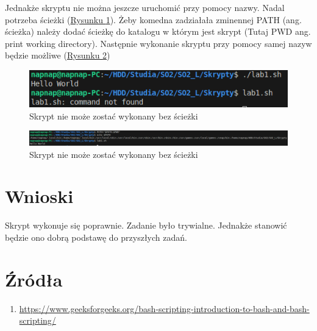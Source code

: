 \documentclass{article}
\begin{document}
      \FloatBarrier
      \raggedright
      Jednakże skryptu nie można jeszcze uruchomić przy pomocy nazwy. Nadal potrzeba ścieżki
      (\hyperref[fig:run_failed]{Rysunku \ref{fig:run_failed}}). Żeby komedna zadziałała zminennej PATH (ang. ścieżka)
      należy dodać ścieżkę do katalogu w którym jest skrypt (Tutaj PWD ang. print working directory). Następnie wykonanie 
      skryptu przy pomocy samej nazyw będzie możliwe (\hyperref[fig:run_succes]{Rysunku \ref{fig:run_succes}})
      \begin{figure}[ht]
        \centering
        \includegraphics[width=\textwidth]{images/run_failed.png}
        \caption{Skrypt nie może zostać wykonany bez ścieżki}
        \label{fig:run_failed}
      \end{figure}
      \begin{figure}[ht]
        \centering
        \includegraphics[width=\textwidth]{images/run_succes.png}
        \caption{Skrypt nie może zostać wykonany bez ścieżki}
        \label{fig:run_succes}
      \end{figure}
    \section{Wnioski}
      Skrypt wykonuje się poprawnie. Zadanie było trywialne. Jednakże stanowić będzie ono dobrą podstawę 
      do przyszłych zadań.
    \section{Źródła}
      \begin{enumerate}[label=\arabic*.]
        \item \url{https://www.geeksforgeeks.org/bash-scripting-introduction-to-bash-and-bash-scripting/}
      \end{enumerate}
\end{document}
